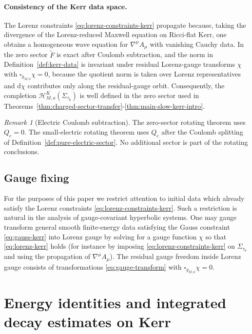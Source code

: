 \documentclass[11pt]{article}
\numberwithin{equation}{section}
\theoremstyle{plain}
\theoremstyle{definition}
\theoremstyle{remark}
\newtheorem{remark}{Remark}[section]
\newcommand{\dd}{\mathrm{d}}
\begin{document}
\paragraph{Consistency of the Kerr data space.}
The Lorenz constraints \eqref{eq:lorenz-constraints-kerr} propagate because, taking the divergence of the Lorenz-reduced Maxwell equation on Ricci-flat Kerr, one obtains a homogeneous wave equation for $\nabla^{\mu}A_{\mu}$ with vanishing Cauchy data. In the zero sector $\widetilde F$ is exact after Coulomb subtraction, and the norm in Definition~\ref{def:kerr-data} is invariant under residual Lorenz-gauge transforms $\chi$ with $\square_{g_{M,a}}\chi=0$, because the quotient norm is taken over Lorenz representatives and $\dd\chi$ contributes only along the residual-gauge orbit. Consequently, the completion \(\mathcal H^{K}_{M,a}(\Sigma_{\tau_{0}})\) is well defined in the zero sector used in Theorems~\ref{thm:charged-sector-transfer}-\ref{thm:main-slow-kerr-intro}.

\begin{remark}[Electric Coulomb subtraction]\label{rem:kerr-data-charges}
The zero-sector rotating theorem uses $Q_e=0$.  The small-electric rotating theorem uses $Q_e$ after the Coulomb splitting of Definition~\ref{def:pure-electric-sector}.  No additional sector is part of the rotating conclusions.
\end{remark}

\subsection{Gauge fixing}\label{subsec:kerr-gauge-fixing}

For the purposes of this paper we restrict attention to initial data which already satisfy the Lorenz constraints \eqref{eq:lorenz-constraints-kerr}.
Such a restriction is natural in the analysis of gauge-covariant hyperbolic systems.
One may gauge transform general smooth finite-energy data satisfying the Gauss constraint \eqref{eq:gauss-kerr} into Lorenz gauge by solving for a gauge function $\chi$ so that \eqref{eq:lorenz-kerr} holds (for instance by imposing \eqref{eq:lorenz-constraints-kerr} on $\Sigma_{\tau_{0}}$ and using the propagation of $\nabla^{\mu}A_{\mu}$).
The residual gauge freedom inside Lorenz gauge consists of transformations \eqref{eq:gauge-transform} with $\square_{g_{M,a}}\chi=0$.



\section{Energy identities and integrated decay estimates on Kerr}\label{sec:kerr-energy}
\end{document}
